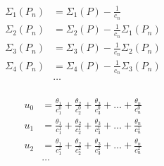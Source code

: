 \begin{equation*} \begin{aligned}
\Sigma_1(P_n) &
= \Sigma_1(P)
- \frac{1}{c_n} \\
\Sigma_2(P_n) &
= \Sigma_2(P)
- \frac{1}{c_n} \Sigma_1(P_n) \\
\Sigma_3(P_n) &
= \Sigma_3(P)
- \frac{1}{c_n} \Sigma_2(P_n) \\
\Sigma_4(P_n) &
= \Sigma_4(P)
- \frac{1}{c_n} \Sigma_3(P_n) \\
& \ldots \\
\end{aligned} \end{equation*}

\begin{equation*} \begin{aligned}
u_0 &
= \frac{\theta_1}{c_1^0}
+ \frac{\theta_2}{c_2^0}
+ \frac{\theta_3}{c_3^0}
+ \ldots
+ \frac{\theta_n}{c_n^0} \\
u_1 &
= \frac{\theta_1}{c_1^1}
+ \frac{\theta_2}{c_2^1}
+ \frac{\theta_3}{c_3^1}
+ \ldots
+ \frac{\theta_n}{c_n^1} \\
u_2 &
= \frac{\theta_1}{c_1^2}
+ \frac{\theta_2}{c_2^2}
+ \frac{\theta_3}{c_3^2}
+ \ldots
+ \frac{\theta_n}{c_n^2} \\
& \ldots \\
\end{aligned} \end{equation*}